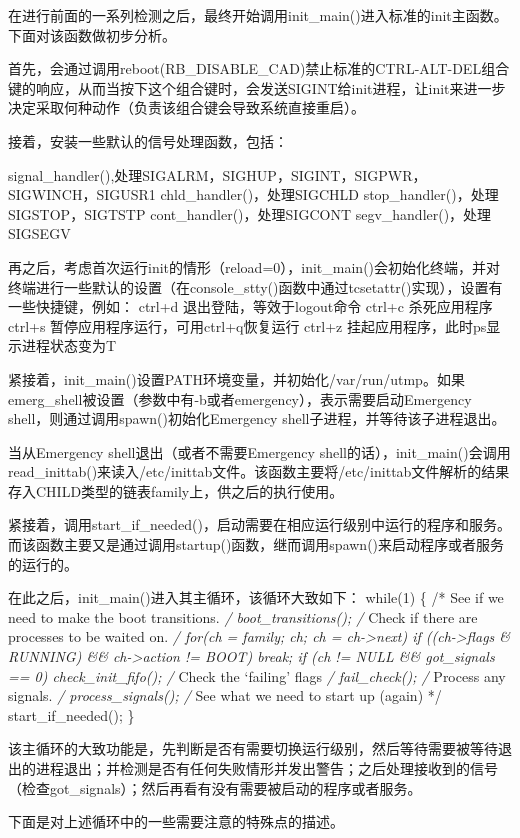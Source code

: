 在进行前面的一系列检测之后，最终开始调用init\_main()进入标准的init主函数。下面对该函数做初步分析。

首先，会通过调用reboot(RB\_DISABLE\_CAD)禁止标准的CTRL-ALT-DEL组合键的响应，从而当按下这个组合键时，会发送SIGINT给init进程，让init来进一步决定采取何种动作（负责该组合键会导致系统直接重启）。

接着，安装一些默认的信号处理函数，包括：

signal\_handler(),处理SIGALRM，SIGHUP，SIGINT，SIGPWR，SIGWINCH，SIGUSR1
chld\_handler()，处理SIGCHLD stop\_handler()，处理SIGSTOP，SIGTSTP
cont\_handler()，处理SIGCONT segv\_handler()，处理SIGSEGV

再之后，考虑首次运行init的情形（reload=0），init\_main()会初始化终端，并对终端进行一些默认的设置（在console\_stty()函数中通过tcsetattr()实现），设置有一些快捷键，例如：
ctrl+d 退出登陆，等效于logout命令 ctrl+c 杀死应用程序 ctrl+s
暂停应用程序运行，可用ctrl+q恢复运行 ctrl+z
挂起应用程序，此时ps显示进程状态变为T

紧接着，init\_main()设置PATH环境变量，并初始化/var/run/utmp。如果emerg\_shell被设置（参数中有-b或者emergency），表示需要启动Emergency
shell，则通过调用spawn()初始化Emergency shell子进程，并等待该子进程退出。

当从Emergency shell退出（或者不需要Emergency
shell的话），init\_main()会调用read\_inittab()来读入/etc/inittab文件。该函数主要将/etc/inittab文件解析的结果存入CHILD类型的链表family上，供之后的执行使用。

紧接着，调用start\_if\_needed()，启动需要在相应运行级别中运行的程序和服务。而该函数主要又是通过调用startup()函数，继而调用spawn()来启动程序或者服务的运行的。

在此之后，init\_main()进入其主循环，该循环大致如下： while(1) \{ /* See if
we need to make the boot transitions. \emph{/ boot\_transitions(); /}
Check if there are processes to be waited on. \emph{/ for(ch = family;
ch; ch = ch-\textgreater{}next) if ((ch-\textgreater{}flags \& RUNNING)
\&\& ch-\textgreater{}action != BOOT) break; if (ch != NULL \&\&
got\_signals == 0) check\_init\_fifo(); /} Check the `failing' flags
\emph{/ fail\_check(); /} Process any signals. \emph{/
process\_signals(); /} See what we need to start up (again) */
start\_if\_needed(); \}

该主循环的大致功能是，先判断是否有需要切换运行级别，然后等待需要被等待退出的进程退出；并检测是否有任何失败情形并发出警告；之后处理接收到的信号（检查got\_signals）；然后再看有没有需要被启动的程序或者服务。

下面是对上述循环中的一些需要注意的特殊点的描述。

